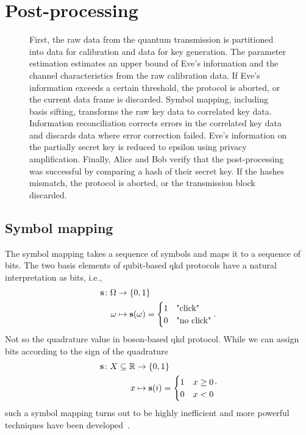 \section{Post-processing}

\begin{figure}[htb]
	\centering
	
	\caption{First, the raw data from the quantum transmission is partitioned into data for calibration and data for key generation. The parameter estimation estimates an upper bound of Eve's information and the channel characteristics from the raw calibration data. If Eve's information exceeds a certain threshold, the protocol is aborted, or the current data frame is discarded. Symbol mapping, including basis sifting, transforms the raw key data to correlated key data. Information reconciliation corrects errors in the correlated key data and discards data where error correction failed. Eve's information on the partially secret key is reduced to epsilon using privacy amplification. Finally, Alice and Bob verify that the post-processing was successful by comparing a hash of their secret key. If the hashes mismatch, the protocol is aborted, or the transmission block discarded.}\label{fig:post_processing}
\end{figure}

\cite{Silberhorn2002} %

\FloatBarrier
\subsection{Symbol mapping}

The symbol mapping takes a sequence of symbols and maps it to a sequence of bits.
The two basis elements of qubit-based \gls{qkd} protocols have a natural interpretation as bits, i.e.,
\begin{equation}
	\begin{split}
		\vb{s}\colon\Omega&\to\{0,1\} \\
		\omega &\mapsto \vb{s}(\omega)
		=
		\begin{cases}
			1 & \text{"click"} \\
			0 & \text{"no click"}
		\end{cases}
		.
	\end{split}
\end{equation}
Not so the quadrature value in boson-based \gls{qkd} protocol.
While we can assign bits according to the sign of the quadrature
\begin{equation}
	\begin{split}
		\vb{s}\colon X\subseteq\mathbb{R}&\to\{0,1\} \\
		x &\mapsto \vb{s}(i)
		=
		\begin{cases}
			1 & x\geq0 \\
			0 & x<0
		\end{cases}
	\end{split}
	,
\end{equation}
such a symbol mapping turns out to be highly inefficient and more powerful techniques have been developed~\cite{VanAsche2004,Leverrier2008}.

